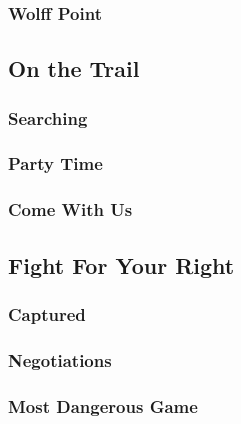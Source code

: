 \subsubsection{Wolff Point}


\subsection{On the Trail}


\subsubsection{Searching}


\subsubsection{Party Time}


\subsubsection{Come With Us}


\subsection{Fight For Your Right}


\subsubsection{Captured}


\subsubsection{Negotiations}


\subsubsection{Most Dangerous Game}

